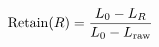 \documentclass[border=3pt]{standalone}
\begin{document}
\color{ink}\fontsize{23}{28}\selectfont
$\displaystyle \operatorname{Retain}(R)=\frac{L_0-L_R}{L_0-L_{\rm raw}}$
\end{document}
